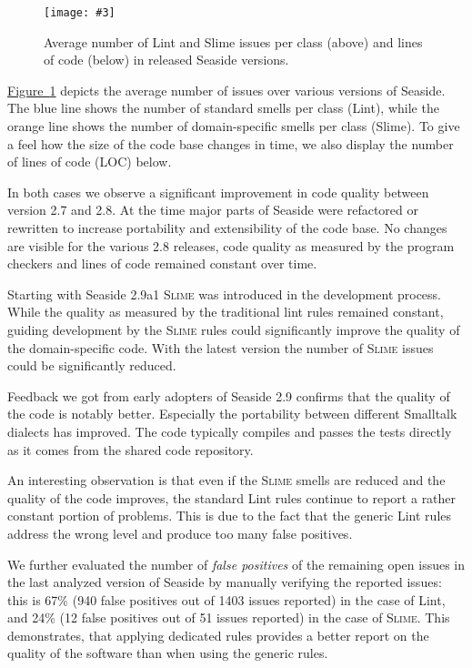 \documentclass[10pt,twocolumn]{article}
\newcommand{\fig}[4]{
	\begin{figure}[#1]
		\centering
		\texttt{[image: \#3]}
		\caption{\label{fig:#3}#4}
	\end{figure}}
\newcommand{\Slime}{\textsc{Slime}\xspace}
\newcommand{\Seaside}{Seaside\xspace}
\newcommand{\figref}[1]{\hyperref[fig:#1]{Figure~\ref{fig:#1}}}
\begin{document}
\fig{h!bt}{0.65}{seaside}{Average number of Lint and Slime issues per class (above) and lines of code (below) in released Seaside versions.}

\figref{seaside} depicts the average number of issues over various versions of Seaside. The blue line shows the number of standard smells per class (Lint), while the orange line shows the number of domain-specific smells per class (Slime). To give a feel how the size of the code base changes in time, we also display the number of lines of code (LOC) below.

In both cases we observe a significant improvement in code quality between version 2.7 and 2.8. At the time major parts of Seaside were refactored or rewritten to increase portability and extensibility of the code base. No changes are visible for the various 2.8 releases, code quality as measured by the program checkers and lines of code remained constant over time.

Starting with \Seaside 2.9a1 \Slime was introduced in the development process. While the quality as measured by the traditional lint rules remained constant, guiding development by the \Slime rules could significantly improve the quality of the domain-specific code. With the latest version the number of \Slime issues could be significantly reduced.

Feedback we got from early adopters of Seaside 2.9 confirms that the quality of the code is notably better. Especially the portability between different Smalltalk dialects has improved. The code typically compiles and passes the tests directly as it comes from the shared code repository.

An interesting observation is that even if the \Slime smells are reduced and the quality of the code improves, the standard Lint rules continue to report a rather constant portion of problems. This is due to the fact that the generic Lint rules address the wrong level and produce too many false positives.

We further evaluated the number of \emph{false positives} of the remaining open issues in the last analyzed version of Seaside by manually verifying the reported issues: this is 67\% (940 false positives out of 1403 issues reported) in the case of Lint, and 24\% (12 false positives out of 51 issues reported) in the case of \Slime. This demonstrates, that applying dedicated rules provides a better report on the quality of the software than when using the generic rules.

\end{document}
